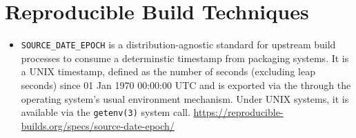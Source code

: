 \section{Reproducible Build Techniques}
\label{SEC:techniques}


\begin{itemize}

\item {\tt SOURCE\_DATE\_EPOCH} is a distribution-agnostic standard for upstream build processes to consume a determinstic timestamp from packaging systems. It is a UNIX timestamp, defined as the number of seconds (excluding leap seconds) since 01 Jan 1970 00:00:00 UTC and is exported via the through the operating system's usual environment mechanism. Under UNIX systems, it is available via the {\tt getenv(3)} system call. \url{https://reproducible-builds.org/specs/source-date-epoch/}

\end{itemize}
